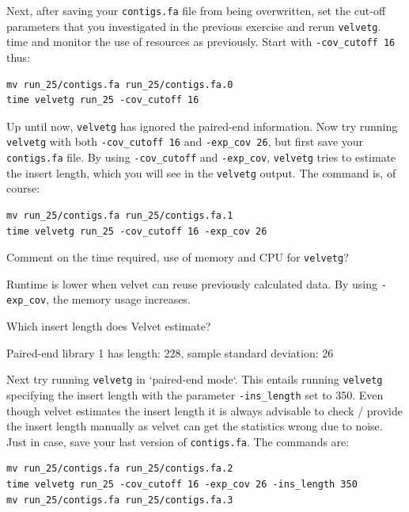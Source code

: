 \begin{steps}
Next, after saving your \texttt{contigs.fa} file from being overwritten, set the
cut-off parameters that you investigated in the previous exercise and rerun
\texttt{velvetg}.
time and monitor the use of resources as previously. Start with
\texttt{-cov\_cutoff 16} thus:
\begin{lstlisting}
mv run_25/contigs.fa run_25/contigs.fa.0
time velvetg run_25 -cov_cutoff 16
\end{lstlisting}

Up until now, \texttt{velvetg} has ignored the paired-end information. Now try
running \texttt{velvetg} with both \texttt{-cov\_cutoff 16} and
\texttt{-exp\_cov 26}, but first save your \texttt{contigs.fa} file. By using
\texttt{-cov\_cutoff} and \texttt{-exp\_cov}, \texttt{velvetg} tries to estimate
the insert length, which you will see in the \texttt{velvetg} output. The
command is, of course:
\begin{lstlisting}
mv run_25/contigs.fa run_25/contigs.fa.1
time velvetg run_25 -cov_cutoff 16 -exp_cov 26
\end{lstlisting}

\end{steps}

\begin{questions}
Comment on the time required, use of memory and CPU for \texttt{velvetg}?
\begin{answer}
Runtime is lower when velvet can reuse previously calculated data. By using
\texttt{-exp\_cov}, the memory usage increases.
\end{answer}

Which insert length does Velvet estimate?
\begin{answer}
Paired-end library 1 has length: 228, sample standard deviation: 26
\end{answer}

\end{questions}

\begin{steps}
Next try running \texttt{velvetg} in `paired-end mode`. This entails running \texttt{velvetg}
specifying the insert length with the parameter \texttt{-ins\_length} set to 350. Even
though velvet estimates the insert length it is always advisable to check /
provide the insert length manually as velvet can get the statistics wrong due
to noise. Just in case, save your last version of \texttt{contigs.fa}. The commands are:
\begin{lstlisting}
mv run_25/contigs.fa run_25/contigs.fa.2
time velvetg run_25 -cov_cutoff 16 -exp_cov 26 -ins_length 350
mv run_25/contigs.fa run_25/contigs.fa.3
\end{lstlisting}
\end{steps}

